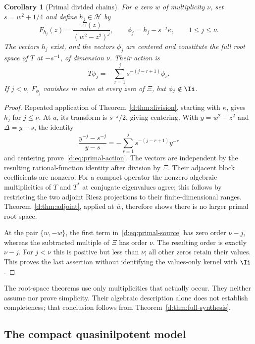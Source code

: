 \documentclass[11pt,a4paper]{article}
\numberwithin{equation}{section}
\newtheorem{corollary}[theorem]{Corollary}
\theoremstyle{definition}\newtheorem{definition}[theorem]{Definition}
\theoremstyle{remark}\newtheorem{remark}[theorem]{Remark}
\newcommand{\Hh}{\mathcal H}\newcommand{\Hw}{\mathcal H}
\begin{document}
\begin{corollary}[Primal divided chains]\label{d:cor:primal}
For a zero $w$ of multiplicity $\nu$, set $s=w^2+1/4$ and define $h_j\in\Hh$ by
\begin{equation}\label{d:eq:primal-source}
 F_{h_j}(z)=\frac{\Xi(z)}{(w^2-z^2)^j},\qquad
 \phi_j=h_j-s^{-j}\kappa,\qquad 1\le j\le\nu.
\end{equation}
The vectors $h_j$ exist, and the vectors $\phi_j$ are centered and constitute the full root space of $T$ at $-s^{-1}$, of dimension $\nu$. Their action is
\begin{equation}\label{d:eq:primal-action}
 T\phi_j=-\sum_{r=1}^j s^{-(j-r+1)}\phi_r.
\end{equation}
If $j<\nu$, $F_{\phi_j}$ vanishes in value at every zero of $\Xi$, but $\phi_j\notin\Ii$.
\end{corollary}
\begin{proof}
Repeated application of Theorem~\ref{d:thm:division}, starting with $\kappa$, gives $h_j$ for $j\le\nu$. At $a$, its transform is $s^{-j}/2$, giving centering. With $y=w^2-z^2$ and $\Delta=y-s$, the identity
\[
 \frac{y^{-j}-s^{-j}}{y-s}
 =-\sum_{r=1}^j s^{-(j-r+1)}y^{-r}
\]
and centering prove~\eqref{d:eq:primal-action}. The vectors are independent by the resulting rational-function identity after division by $\Xi$. Their adjacent block coefficients are nonzero. For a compact operator the nonzero algebraic multiplicities of $T$ and $T^*$ at conjugate eigenvalues agree; this follows by restricting the two adjoint Riesz projections to their finite-dimensional ranges. Theorem~\ref{d:thm:adjoint}, applied at $\overline w$, therefore shows there is no larger primal root space.

At the pair $\{w,-w\}$, the first term in~\eqref{d:eq:primal-source} has zero order $\nu-j$, whereas the subtracted multiple of $\Xi$ has order $\nu$. The resulting order is exactly $\nu-j$. For $j<\nu$ this is positive but less than $\nu$; all other zeros retain their values. This proves the last assertion without identifying the values-only kernel with $\Ii$.
\end{proof}

The root-space theorems use only multiplicities that actually occur. They neither assume nor prove simplicity. Their algebraic description alone does not establish completeness; that conclusion follows from Theorem~\ref{d:thm:full-synthesis}.

\subsection{The compact quasinilpotent model}\label{d:sec:gap}
\end{document}
